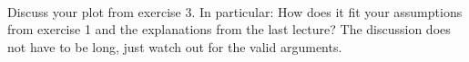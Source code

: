  \\
Discuss your plot from exercise 3.
In particular: How does it fit your assumptions from exercise 1 and the
explanations from the last lecture?
The discussion does not have to be long, just watch out for the valid arguments.